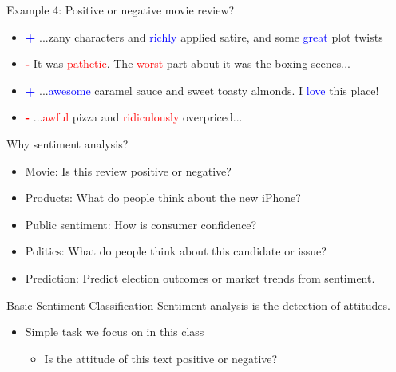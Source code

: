 \documentclass[handout]{beamer}
\begin{document}
\begin{frame}{Example 4: Positive or negative movie review?}
    \begin{itemize}
     \item  \textcolor{blue}{\textbf{+}}   ...zany characters and \textcolor{blue}{richly} applied satire, and some \textcolor{blue}{great} plot twists 
     \item   \textcolor{red}{\textbf{-}} It was \textcolor{red}{pathetic}. The \textcolor{red}{worst} part about it was the boxing scenes... 
    \item   \textcolor{blue}{\textbf{+}}  ...\textcolor{blue}{awesome} caramel sauce and sweet toasty almonds. I \textcolor{blue}{love} this place! \\
     \item \textcolor{red}{\textbf{-}} ...\textcolor{red}{awful} pizza and \textcolor{red}{ridiculously} overpriced... 
    \end{itemize}

\end{frame}

\begin{frame}{Why sentiment analysis?}
    \begin{itemize}
        \item Movie: Is this review positive or negative?
        \item Products: What do people think about the new iPhone?
        \item Public sentiment: How is consumer confidence?
        \item Politics: What do people think about this candidate or issue?
        \item Prediction: Predict election outcomes or market trends from sentiment.
    \end{itemize}
\end{frame}


\begin{frame}{Basic Sentiment Classification}
    Sentiment analysis is the detection of attitudes.
    \begin{itemize}
        \item Simple task we focus on in this class
        \begin{itemize}
            \item Is the attitude of this text positive or negative?
        \end{itemize}
    \end{itemize}
\end{frame}
\end{document}
